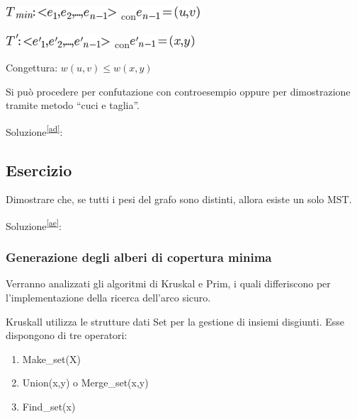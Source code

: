 \documentclass{article}
\providecommand{\tightlist}{%
  \setlength{\itemsep}{0pt}\setlength{\parskip}{0pt}}
\begin{document}
{{{\includegraphics{images/image476.png}{~con}\includegraphics{images/image477.png}

\includegraphics{images/image478.png}{~con}\includegraphics{images/image479.png}

{Congettura: }$w(u,v) \leq w(x,y)${~}

{Si può procedere per confutazione con controesempio oppure per dimostrazione tramite metodo ``cuci e taglia''.}

{Soluzione}\textsuperscript{\protect\hyperlink{cmnt30}{{[}ad{]}}}{:}

\subsection{Esercizio}

{Dimostrare che, se tutti i pesi del grafo sono distinti, allora esiste un solo MST.}

{Soluzione}\textsuperscript{\protect\hyperlink{cmnt31}{{[}ae{]}}}{:}

\hypertarget{h.42rszsg7qe80}{\subsubsection{\texorpdfstring{{Generazione degli alberi di copertura minima}}{Generazione degli alberi di copertura minima}}\label{h.42rszsg7qe80}}

\protect\hypertarget{t.89c877068ffb6efc80378955af5aa00fb054212d}{}{}\protect\hypertarget{t.40}{}{}



{Verranno analizzati gli algoritmi di Kruskal e Prim, i quali differiscono per l'implementazione della ricerca dell'arco sicuro.}

{Kruskall utilizza le strutture dati Set per la gestione di insiemi disgiunti. Esse dispongono di tre operatori:}

\begin{enumerate}
\tightlist
\item
  {Make\_set(X)}
\item
  {Union(x,y) o Merge\_set(x,y)}
\item
  {Find\_set(x)}
\end{enumerate}

}}}
\end{document}
